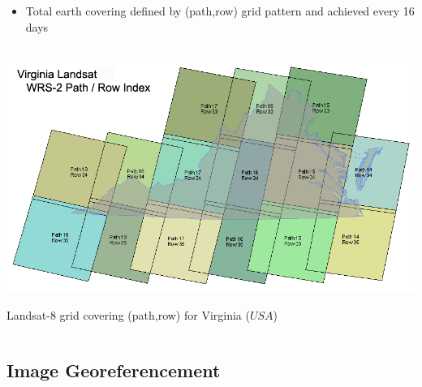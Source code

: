 \documentclass[c]{beamer}
\begin{document}
\begin{frame}

\begin{itemize}
\item Total earth covering defined by (path,row) grid pattern and achieved every 16 days
\end{itemize}
\begin{columns}
\begin{column}{\textwidth}
\begin{overlayarea}{\linewidth}{4cm}
  \centering\vfill
  \includegraphics[scale=0.2]{images/covering/wrs.png}
\end{overlayarea}
\begin{overlayarea}{\linewidth}{1cm}
  \centering
  \tiny Landsat-8 grid covering (path,row) for Virginia ($USA$)\par
\end{overlayarea}
\end{column}
\end{columns}

\end{frame}

\subsection{Image Georeferencement}
\end{document}
